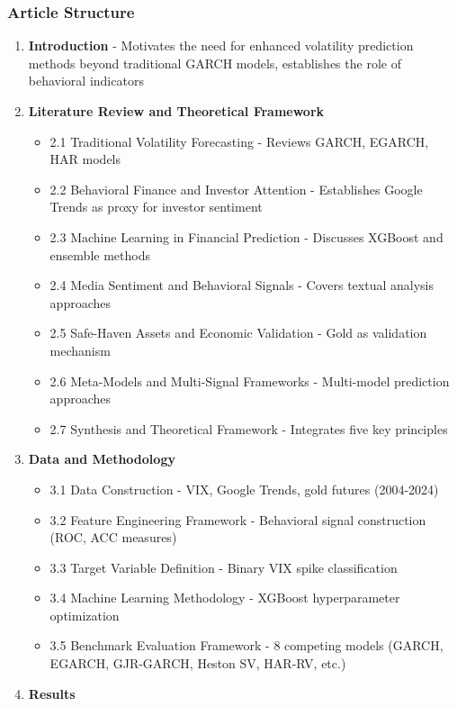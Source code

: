 \documentclass[12pt,a4paper]{article}
\begin{document}
\subsubsection{Article Structure}
\begin{enumerate}
    \item \textbf{Introduction} - Motivates the need for enhanced volatility prediction methods beyond traditional GARCH models, establishes the role of behavioral indicators
    \item \textbf{Literature Review and Theoretical Framework}
    \begin{itemize}
        \item 2.1 Traditional Volatility Forecasting - Reviews GARCH, EGARCH, HAR models
        \item 2.2 Behavioral Finance and Investor Attention - Establishes Google Trends as proxy for investor sentiment
        \item 2.3 Machine Learning in Financial Prediction - Discusses XGBoost and ensemble methods
        \item 2.4 Media Sentiment and Behavioral Signals - Covers textual analysis approaches
        \item 2.5 Safe-Haven Assets and Economic Validation - Gold as validation mechanism
        \item 2.6 Meta-Models and Multi-Signal Frameworks - Multi-model prediction approaches
        \item 2.7 Synthesis and Theoretical Framework - Integrates five key principles
    \end{itemize}
    \item \textbf{Data and Methodology}
    \begin{itemize}
        \item 3.1 Data Construction - VIX, Google Trends, gold futures (2004-2024)
        \item 3.2 Feature Engineering Framework - Behavioral signal construction (ROC, ACC measures)
        \item 3.3 Target Variable Definition - Binary VIX spike classification
        \item 3.4 Machine Learning Methodology - XGBoost hyperparameter optimization
        \item 3.5 Benchmark Evaluation Framework - 8 competing models (GARCH, EGARCH, GJR-GARCH, Heston SV, HAR-RV, etc.)
    \end{itemize}
    \item \textbf{Results}
    \begin{itemize}

\end{itemize}
\end{enumerate}
\end{document}
